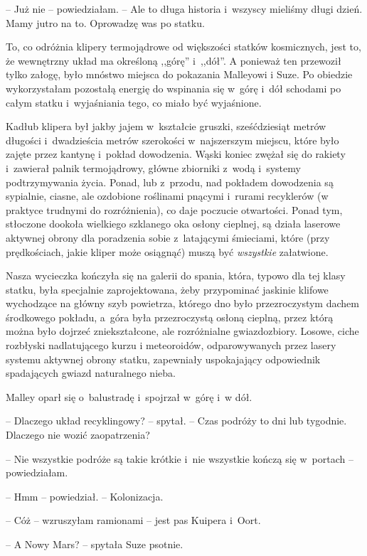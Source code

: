 \documentclass[oneside,polish,11pt,sfheadings]{mwbk}
\begin{document}
-- Już nie -- powiedziałam. -- Ale to długa historia i~wszyscy mieliśmy
długi dzień. Mamy jutro na to. Oprowadzę was po statku.

To, co odróżnia klipery termojądrowe od większości statków kosmicznych,
jest to, że wewnętrzny układ ma określoną ,,górę'' i~,,dół''. A ponieważ
ten przewoził tylko załogę, było mnóstwo miejsca do pokazania Malleyowi
i Suze. Po obiedzie wykorzystałam pozostałą energię do wspinania się w~górę i~dół schodami po całym statku i~wyjaśniania tego, co miało być
wyjaśnione.

Kadłub klipera był jakby jajem w~kształcie gruszki, sześćdziesiąt metrów
długości i~dwadzieścia metrów szerokości w~najszerszym miejscu, które
było zajęte przez kantynę i~pokład dowodzenia. Wąski koniec zwężał się
do rakiety i~zawierał palnik termojądrowy, główne zbiorniki z~wodą i~systemy podtrzymywania życia. Ponad, lub z~przodu, nad pokładem
dowodzenia są sypialnie, ciasne, ale ozdobione roślinami pnącymi i~rurami recyklerów (w praktyce trudnymi do rozróżnienia), co daje
poczucie otwartości. Ponad tym, stłoczone dookoła wielkiego szklanego
oka osłony cieplnej, są działa laserowe aktywnej obrony dla poradzenia
sobie z~latającymi śmieciami, które (przy prędkościach, jakie kliper
może osiągnąć) muszą być \textit{wszystkie} załatwione.

Nasza wycieczka kończyła się na galerii do spania, która, typowo dla tej
klasy statku, była specjalnie zaprojektowana, żeby przypominać jaskinie
klifowe wychodzące na główny szyb powietrza, którego dno było
przezroczystym dachem środkowego pokładu, a~góra była przezroczystą
osłoną cieplną, przez którą można było dojrzeć zniekształcone, ale
rozróżnialne gwiazdozbiory. Losowe, ciche rozbłyski nadlatującego kurzu
i meteoroidów, odparowywanych przez lasery systemu aktywnej obrony
statku, zapewniały uspokajający odpowiednik spadających gwiazd
naturalnego nieba.

Malley oparł się o~balustradę i~spojrzał w~górę i~w dół.

-- Dlaczego układ recyklingowy? -- spytał. -- Czas podróży to dni lub
tygodnie. Dlaczego nie wozić zaopatrzenia?

-- Nie wszystkie podróże są takie krótkie i~nie wszystkie kończą się w~portach -- powiedziałam.

-- Hmm -- powiedział. -- Kolonizacja.

-- Cóż -- wzruszyłam ramionami -- jest pas Kuipera i~Oort.

-- A Nowy Mars? -- spytała Suze psotnie.
\end{document}
